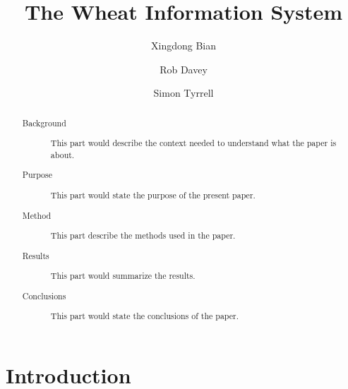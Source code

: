 \documentclass{report}
\begin{document}
\title{The Wheat Information System}

\author {Xingdong Bian}
\author {Rob Davey} 
\author {Simon Tyrrell}

\maketitle

\begin{abstract} 
\begin{description} 
\item[Background] This part would describe
the context needed to understand what the paper is about. 
\item[Purpose] This
part would state the purpose of the present paper. 
\item[Method] This part
describe the methods used in the paper.
\item[Results] This part would
summarize the results. 
\item[Conclusions] This part would state the conclusions
of the paper. 
\end{description} 
\end{abstract}

\chapter{Introduction}


\end{document}
